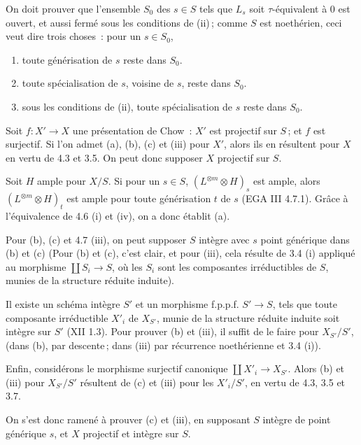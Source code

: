 On doit prouver que l'ensemble \(S_0\) des \(s\in S\) tels que \(L_s\) soit \(\tau\)-\'equivalent \`a \(0\) est ouvert, et aussi ferm\'e sous les conditions de (ii)\,; comme \(S\) est noeth\'erien, ceci veut dire trois choses~: pour un \(s\in S_0\),
\begin{enumerate}[label=(\alph*)]
\item toute g\'en\'erisation de \(s\) reste dans \(S_0\).
\item toute sp\'ecialisation de \(s\), voisine de \(s\), reste dans \(S_0\).
\item sous les conditions de (ii), toute sp\'ecialisation de \(s\) reste dans \(S_0\).
\end{enumerate}

Soit \(f:X'\to X\) une pr\'esentation de Chow~: \(X'\) est projectif sur \(S\)\,; et \(f\) est surjectif. Si l'on admet (a), (b), (c) et (iii) pour \(X'\), alors ils en r\'esultent pour \(X\) en vertu de 4.3 et 3.5. On peut donc supposer \(X\) projectif sur \(S\).

Soit \(H\) ample pour \(X/S\). Si pour un \(s\in S\), \((L^{\otimes m}\otimes H)_s\) est ample, alors \((L^{\otimes m}\otimes H)_t\) est ample pour toute g\'en\'erisation \(t\) de \(s\) (EGA III 4.7.1). Gr\^ace \`a l'\'equivalence de 4.6 (i) et (iv), on a donc \'etablit (a).

Pour (b), (c) et 4.7 (iii), on peut supposer \(S\) int\`egre avec \(s\) point g\'en\'erique dans (b) et (c) (Pour (b) et (c), c'est clair, et pour (iii), cela r\'esulte de 3.4 (i) appliqu\'e au morphisme \(\coprod S_i\to S\), o\`u les \(S_i\) sont les composantes irr\'eductibles de \(S\), munies de la structure r\'eduite induite).

Il existe un sch\'ema int\`egre \(S'\) et un morphisme f.p.p.f. \(S'\to S\), tels que toute composante irr\'eductible \(X'_i\) de \(X_{S'}\), munie de la structure r\'eduite induite soit int\`egre sur \(S'\) (XII 1.3). Pour prouver (b) et (iii), il suffit de le faire pour \(X_{S'}/S'\), (dans (b), par descente\,; dans (iii) par r\'ecurrence noeth\'erienne et 3.4 (i)).

Enfin, consid\'erons le morphisme surjectif canonique \(\coprod X'_i\to X_{S'}\). Alors (b) et (iii) pour \(X_{S'}/S'\) r\'esultent de (c) et (iii) pour les \(X'_i/S'\), en vertu de 4.3, 3.5 et 3.7.

On s'est donc ramen\'e \`a prouver (c) et (iii), en supposant \(S\) int\`egre de point g\'en\'erique \(s\), et \(X\) projectif et int\`egre sur \(S\).

